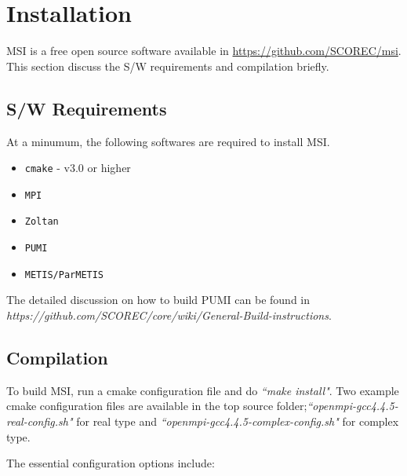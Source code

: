 \documentclass[11pt]{article}  %
\begin{document}
\tableofcontents
\newpage


\section{Installation}

MSI is a free open source software available in \url{https://github.com/SCOREC/msi}. 
This section discuss the S/W requirements and compilation briefly. 

\subsection{S/W Requirements}

At a minumum, the following softwares are required to install MSI.
\begin{itemize}
\item \texttt{cmake} - v3.0 or higher
\item \texttt{MPI}
\item \texttt{Zoltan}~\cite{ZoltanOverviewArticle2002}
\item \texttt{PUMI}~\cite{pumi16, pumiweb}
\item \texttt{METIS/ParMETIS} ~\cite{ParmetisOverviewArticle2002}
\end{itemize}

The detailed discussion on how to build PUMI can be found in \emph{https://github.com/SCOREC/core/wiki/General-Build-instructions}.

\subsection{Compilation}

To build MSI, run a cmake configuration file and do \emph{``make install"}. Two example cmake configuration files are available in the top source folder;\emph{``openmpi-gcc4.4.5-real-config.sh"} for real type and \emph{``openmpi-gcc4.4.5-complex-config.sh"} for complex type.

The essential configuration options include: 
\end{document}
